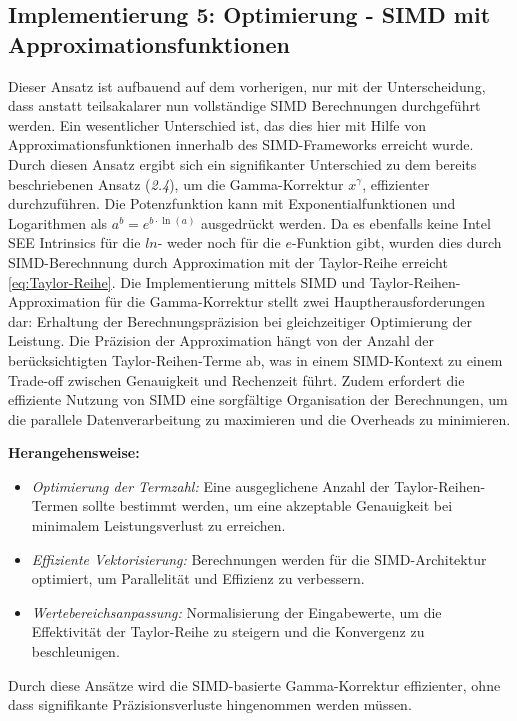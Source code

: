 \documentclass[course=erap]{aspdoc}
\begin{document}
\subsection{Implementierung 5: Optimierung - SIMD mit Approximationsfunktionen}
Dieser Ansatz ist aufbauend auf dem vorherigen, nur mit der Unterscheidung, dass anstatt teilsakalarer nun vollständige SIMD Berechnungen durchgeführt werden. Ein wesentlicher Unterschied ist, das dies hier mit Hilfe von Approximationsfunktionen innerhalb des SIMD-Frameworks erreicht wurde. 
Durch diesen Ansatz ergibt sich ein signifikanter Unterschied zu dem bereits beschriebenen Ansatz (\textit{2.4}), um die Gamma-Korrektur $x^{\gamma}$, effizienter durchzuführen.
Die Potenzfunktion kann mit Exponentialfunktionen und Logarithmen als \(a^b = e^{b \cdot \ln(a)}\) ausgedrückt werden. 
Da es ebenfalls keine Intel SEE Intrinsics für die $ln$- weder noch für die $e$-Funktion gibt, wurden dies durch SIMD-Berechnnung durch Approximation mit der Taylor-Reihe erreicht \eqref{eq:Taylor-Reihe}.
Die Implementierung mittels SIMD und Taylor-Reihen-Approximation für die Gamma-Korrektur stellt zwei Hauptherausforderungen dar: Erhaltung der Berechnungspräzision bei gleichzeitiger Optimierung der Leistung. Die Präzision der Approximation hängt von der Anzahl der berücksichtigten Taylor-Reihen-Terme ab, was in einem SIMD-Kontext zu einem Trade-off zwischen Genauigkeit und Rechenzeit führt. Zudem erfordert die effiziente Nutzung von SIMD eine sorgfältige Organisation der Berechnungen, um die parallele Datenverarbeitung zu maximieren und die Overheads zu minimieren.

\textbf{Herangehensweise:}
\begin{itemize}
    \item \textit{Optimierung der Termzahl:} Eine ausgeglichene Anzahl der Taylor-Reihen-Termen sollte bestimmt werden, um eine akzeptable Genauigkeit bei minimalem Leistungsverlust zu erreichen.
    \item \textit{Effiziente Vektorisierung:} Berechnungen werden für die SIMD-Architektur optimiert, um Parallelität und Effizienz zu verbessern.
    \item \textit{Wertebereichsanpassung:} Normalisierung der Eingabewerte, um die Effektivität der Taylor-Reihe zu steigern und die Konvergenz zu beschleunigen.
\end{itemize}


Durch diese Ansätze wird die SIMD-basierte Gamma-Korrektur effizienter, ohne dass signifikante Präzisionsverluste hingenommen werden müssen.
\end{document}
